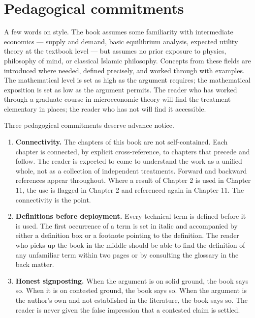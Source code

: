 \section*{Pedagogical commitments}

A few words on style. The book assumes some familiarity with
intermediate economics --- supply and demand, basic equilibrium
analysis, expected utility theory at the textbook level --- but
assumes no prior exposure to physics, philosophy of mind, or classical
Islamic philosophy. Concepts from these fields are introduced where
needed, defined precisely, and worked through with examples. The
mathematical level is set as high as the argument requires; the
mathematical exposition is set as low as the argument permits. The
reader who has worked through a graduate course in microeconomic
theory will find the treatment elementary in places; the reader who
has not will find it accessible.

Three pedagogical commitments deserve advance notice.

\begin{enumerate}
    \item \textbf{Connectivity.} The chapters of this book are not
    self-contained. Each chapter is connected, by explicit
    cross-reference, to chapters that precede and follow. The reader
    is expected to come to understand the work as a unified whole, not
    as a collection of independent treatments. Forward and backward
    references appear throughout. Where a result of Chapter 2 is used
    in Chapter 11, the use is flagged in Chapter 2 and referenced
    again in Chapter 11. The connectivity is the point.

    \item \textbf{Definitions before deployment.} Every technical term
    is defined before it is used. The first occurrence of a term is
    set in italic and accompanied by either a definition box or a
    footnote pointing to the definition. The reader who picks up the
    book in the middle should be able to find the definition of any
    unfamiliar term within two pages or by consulting the glossary in
    the back matter.

    \item \textbf{Honest signposting.} When the argument is on solid
    ground, the book says so. When it is on contested ground, the
    book says so. When the argument is the author's own and not
    established in the literature, the book says so. The reader is
    never given the false impression that a contested claim is
    settled.
\end{enumerate}

